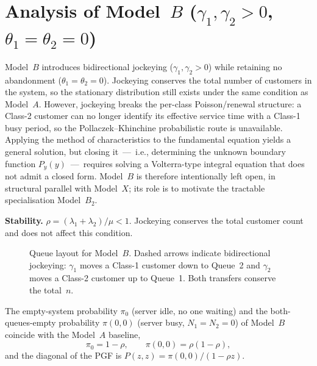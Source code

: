 \section{Analysis of Model~\texorpdfstring{$B$}{B} (\texorpdfstring{$\gamma_1,\gamma_2>0$}{gamma1,gamma2>0}, \texorpdfstring{$\theta_1=\theta_2=0$}{theta1=theta2=0})}\label{sec:model_b}

Model~$B$ introduces bidirectional jockeying ($\gamma_1,\gamma_2>0$) while retaining no abandonment ($\theta_1=\theta_2=0$). Jockeying conserves the total number of customers in the system, so the stationary distribution still exists under the same condition as Model~$A$. However, jockeying breaks the per-class Poisson/renewal structure: a Class-2 customer can no longer identify its effective service time with a Class-1 busy period, so the Pollaczek--Khinchine probabilistic route is unavailable. Applying the method of characteristics to the fundamental equation yields a general solution, but closing it~---~i.e., determining the unknown boundary function $P_y(y)$~---~requires solving a Volterra-type integral equation that does not admit a closed form. Model~$B$ is therefore intentionally left open, in structural parallel with Model~$X$; its role is to motivate the tractable specialisation Model~$B_2$.

\textbf{Stability.} $\rho = (\lambda_1+\lambda_2)/\mu < 1$. Jockeying conserves the total customer count and does not affect this condition.

\begin{figure}[H]
    \centering
    \resizebox{0.62\textwidth}{!}{%
    }
    \caption{Queue layout for Model~$B$. Dashed arrows indicate bidirectional
    jockeying: $\gamma_1$ moves a Class-1 customer down to Queue~2 and $\gamma_2$
    moves a Class-2 customer up to Queue~1. Both transfers conserve the total~$n$.}
    \label{fig:model-b-queue}
\end{figure}

\begin{corollary}\label{cor:B:pi00}
    The empty-system probability $\pi_0$ (server idle, no one waiting) and the
    both-queues-empty probability $\pi(0,0)$ (server busy, $N_1=N_2=0$) of Model~$B$
    coincide with the Model~$A$ baseline,
    \begin{equation}
        \pi_0 = 1-\rho, \qquad \pi(0,0) = \rho(1-\rho),
        \label{eq:B:pi00}
    \end{equation}
    and the diagonal of the PGF is $P(z,z)=\pi(0,0)/(1-\rho z)$.
\end{corollary}

